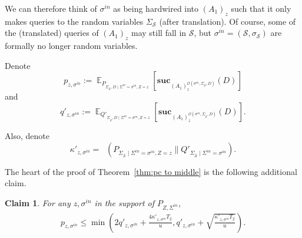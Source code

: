 \documentclass[11pt]{article}
\newtheorem{claim}[theorem]{Claim}
\DeclareMathOperator*{\E}{\mathbb{E}}
\DeclareMathOperator{\KL}{D_{\text{KL}}}
\newcommand{\SECV}{{D}}
\newcommand{\SUC}{\boldsymbol{suc}}
\begin{document}
We can therefore think of $\sigma^{in}$ as being hardwired into $(A_1)_{z}$ such that it only makes queries to the random variables 
$\Sigma_{\mathcal{S}}$ (after translation). Of course, some of the (translated) queries of $(A_1)_{z}$ may still fall in $\mathcal{S}$, but 
$\sigma^{in} = (\mathcal{S},\sigma_{\mathcal{S}})$ are formally no longer random variables.


Denote
$$p_{z, \sigma^{in} } := 
\E_{P_{ \Sigma_{\overline{\mathcal{S}} },\SECV \mid \Sigma^{in} = \sigma^{in}, Z=z}}
[ \SUC_{(A_1)_{z}^{\mathcal{O}( \sigma^{in}, \Sigma_{\overline{\mathcal{S}}},\SECV)}}(\SECV)
] $$ 
and
$$q'_{z, \sigma^{in} } := \E_{Q'_{ \Sigma_{\overline{\mathcal{S}} },\SECV \mid  \Sigma^{in} = \sigma^{in}, Z=z}}
[ \SUC_{(A_1)_{z}^{\mathcal{O}( \sigma^{in}, \Sigma_{\overline{\mathcal{S}}},\SECV)}}(\SECV)
].
$$ 

Also, denote
$$\kappa'_{z, \sigma^{in} } = 
\KL( P_{ \Sigma_{\overline{\mathcal{S}}} \mid \Sigma^{in} = \sigma^{in} , Z = z} \| Q'_{ \Sigma_{ \overline{\mathcal{S}} } \mid \Sigma^{in} = \sigma^{in} } ). 
$$

The heart of the proof of Theorem~\ref{thm:pc to middle} is the following additional claim. 
\begin{claim} \label{clm:advice main-eq2}
For any $z,\sigma^{in}$ in the support of $P_{Z,\Sigma^{in}}$,
\begin{align*} 
p_{z, \sigma^{in} }
\leq 
\min \left(
2 q'_{z, \sigma^{in} }
+ 
\frac{4 \kappa'_{z, \sigma^{in} } T_2 }{u},
q'_{z,\sigma^{in} } + \sqrt{\frac{\kappa'_{z,  \sigma^{in} } T_2} {{u}}} 
\right).
\end{align*}
\end{claim}
\end{document}

